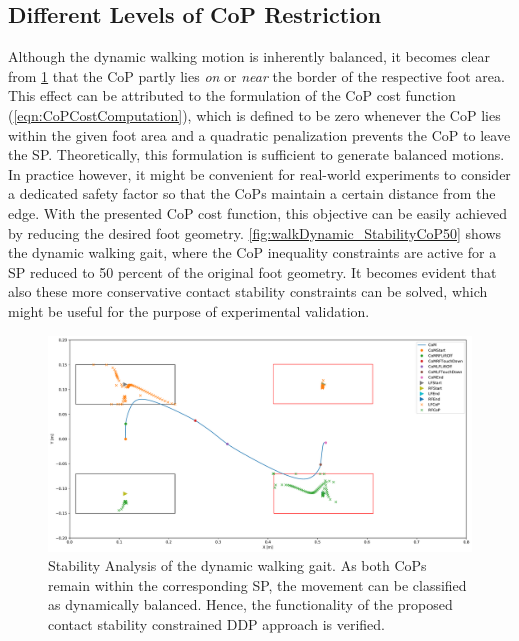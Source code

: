\subsection{Different Levels of CoP Restriction}
Although the dynamic walking motion is inherently balanced, it becomes clear from \cref{fig:walkDynamic_StabilityCoP100} that the \gls{CoP} partly lies \textit{on} or \textit{near} the border of the respective foot area. This effect can be attributed to the formulation of the \gls{CoP} cost function (\cref{eqn:CoPCostComputation}), which is defined to be zero whenever the \gls{CoP} lies within the given foot area and a quadratic penalization prevents the \gls{CoP} to leave the \gls{SP}. 
Theoretically, this formulation is sufficient to generate balanced motions. 
In practice however, it might be convenient for real-world experiments to consider a dedicated safety factor so that the \gls{CoP}s maintain a certain distance from the edge. With the presented \gls{CoP} cost function, this objective can be easily achieved by reducing the desired foot geometry. 
\cref{fig:walkDynamic_StabilityCoP50} shows the dynamic walking gait, where the \gls{CoP} inequality constraints are active for a \gls{SP} reduced to 50 percent of the original foot geometry. It becomes evident that also these more conservative contact stability constraints can be solved, which might be useful for the purpose of experimental validation. 

\begin{figure}[h!]
\centering	
\includegraphics[width=1\textwidth]{fig/walkDynamic/StabilityAnalysis_CoP100}
\caption[Stability Analysis of the dynamic walking gait]{Stability Analysis of the dynamic walking gait. As both \gls{CoP}s remain within the corresponding SP, the movement can be classified as dynamically balanced. Hence, the functionality of the proposed contact stability constrained \gls{DDP} approach is verified.}
\label{fig:walkDynamic_StabilityCoP100}
\end{figure} 

